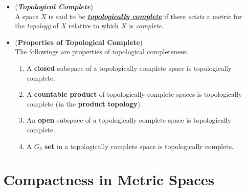 \documentclass[11pt]{article}
\begin{document}
\begin{itemize}
\item \begin{definition} (\emph{\textbf{Topological Complete}})\\
A space $X$ is said to be \underline{\emph{\textbf{topologically complete}}} if there \emph{exists} a metric for the \emph{topology} of $X$ relative to which $X$ is \emph{complete}.
\end{definition}

\item \begin{proposition} (\textbf{Properties of Topological Complete}) \citep{munkres2000topology}\\
The followings are properties of topological completeness:
\begin{enumerate}
\item A \textbf{closed} subspace of a topologically complete space is topologically complete.
\item A \textbf{countable product} of topologically complete spaces is topologically complete (in the \textbf{product topology}).
\item An \textbf{open} subspace of a topologically complete space is topologically complete.
\item A \textbf{$G_{\delta}$ set} in a topologically complete space is topologically complete. 
\end{enumerate}
\end{proposition}
\end{itemize}

\section{Compactness in Metric Spaces}
\end{document}
